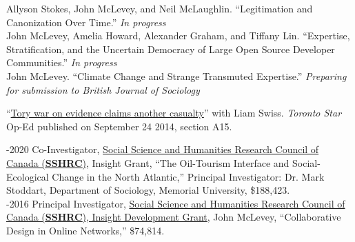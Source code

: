 \documentclass[9pt,usenames,dvipsnames]{article}
\begin{document}
\ind Allyson Stokes, John McLevey, and Neil McLaughlin. ``Legitimation and Canonization Over Time.'' \emph{In progress}\\ %

\ind John McLevey, Amelia Howard, Alexander Graham, and Tiffany Lin. ``Expertise, Stratification, and the Uncertain Democracy of Large Open Source Developer Communities.'' \emph{In progress}\\

\ind John McLevey. ``Climate Change and Strange Transmuted Expertise.'' \emph{Preparing for submission to British Journal of Sociology} \\





\ind ``\href{http://bit.ly/1ohSn1N}{Tory war on evidence claims another casualty}'' with Liam Swiss. \emph{Toronto Star} Op-Ed published on September 24 2014, section A15. \\ 


-2020 Co-Investigator, \href{http://www.sshrc-crsh.gc.ca/funding-financement/programs-programmes/insight_development_grants-su
bventions_de_developpement_savoir-eng.aspx}{Social Science and Humanities Research Council of Canada (\textbf{SSHRC})}, Insight Grant, ``The Oil-Tourism Interface and Social-Ecological Change in the North Atlantic,'' Principal Investigator: Dr. Mark Stoddart, Department of Sociology, Memorial University, \$188,423. \\

-2016 Principal Investigator, \href{http://www.sshrc-crsh.gc.ca/funding-financement/programs-programmes/insight_development_grants-su
bventions_de_developpement_savoir-eng.aspx}{Social Science and Humanities Research Council of Canada (\textbf{SSHRC}), Insight Development Grant}, John McLevey, ``Collaborative Design in Online Networks,'' \$74,814. \\
\end{document}

